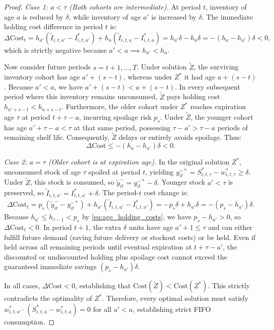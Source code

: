\documentclass[11pt,a4paper]{article}
\theoremstyle{definition}
\theoremstyle{remark}
\begin{document}
\begin{proof}
\textit{Case 1: $a < \tau$ (Both cohorts are intermediate).}
At period $t$, inventory of age $a$ is reduced by $\delta$, while inventory of age $a'$ is increased by $\delta$. The immediate holding cost difference in period $t$ is:
\begin{equation*}
    \Delta \text{Cost}_t = h_{a'} (\tilde{I}_{i,t,a'} - I_{i,t,a'}^*) + h_a (\tilde{I}_{i,t,a} - I_{i,t,a}^*) = h_{a'} \delta - h_a \delta = -(h_a - h_{a'}) \delta < 0,
\end{equation*}
which is strictly negative because $a' < a \implies h_{a'} < h_a$.

Now consider future periods $s = t + 1, \dots, T$. Under solution $\tilde{Z}$, the surviving inventory cohort has age $a' + (s - t)$, whereas under $Z^*$ it had age $a + (s - t)$. Because $a' < a$, we have $a' + (s - t) < a + (s - t)$. In every subsequent period where this inventory remains unconsumed, $\tilde{Z}$ pays holding cost $h_{a' + s - t} < h_{a + s - t}$. Furthermore, the older cohort under $Z^*$ reaches expiration age $\tau$ at period $t + \tau - a$, incurring spoilage risk $p_s$. Under $\tilde{Z}$, the younger cohort has age $a' + \tau - a < \tau$ at that same period, possessing $\tau - a' > \tau - a$ periods of remaining shelf life. Consequently, $\tilde{Z}$ delays or entirely avoids spoilage. Thus:
\begin{equation*}
    \Delta \text{Cost} \le -(h_a - h_{a'}) \delta < 0.
\end{equation*}

\textit{Case 2: $a = \tau$ (Older cohort is at expiration age).}
In the original solution $Z^*$, unconsumed stock of age $\tau$ spoiled at period $t$, yielding $y_{it}^{-*} = S_{i,t,\tau}^* - w_{i,t,\tau}^* \ge \delta$. Under $\tilde{Z}$, this stock is consumed, so $\tilde{y}_{it}^- = y_{it}^{-*} - \delta$. Younger stock $a' < \tau$ is preserved, so $\tilde{I}_{i,t,a'} = I_{i,t,a'}^* + \delta$. The period-$t$ cost change is:
\begin{equation*}
    \Delta \text{Cost}_t = p_s (\tilde{y}_{it}^- - y_{it}^{-*}) + h_{a'} (\tilde{I}_{i,t,a'} - I_{i,t,a'}^*) = -p_s \delta + h_{a'} \delta = -(p_s - h_{a'}) \delta.
\end{equation*}
Because $h_{a'} \le h_{\tau-1} < p_s$ by \eqref{eq:age_holding_costs}, we have $p_s - h_{a'} > 0$, so $\Delta \text{Cost}_t < 0$. In period $t+1$, the extra $\delta$ units have age $a'+1 \le \tau$ and can either fulfill future demand (saving future delivery or stockout costs) or be held. Even if held across all remaining periods until eventual expiration at $t + \tau - a'$, the discounted or undiscounted holding plus spoilage cost cannot exceed the guaranteed immediate savings $(p_s - h_{a'})\delta$.

In all cases, $\Delta \text{Cost} < 0$, establishing that $\text{Cost}(\tilde{Z}) < \text{Cost}(Z^*)$. This strictly contradicts the optimality of $Z^*$. Therefore, every optimal solution must satisfy $w_{i,t,a'}^* \cdot (S_{i,t,a}^* - w_{i,t,a}^*) = 0$ for all $a' < a$, establishing strict FIFO consumption.
\end{proof}
\end{document}
